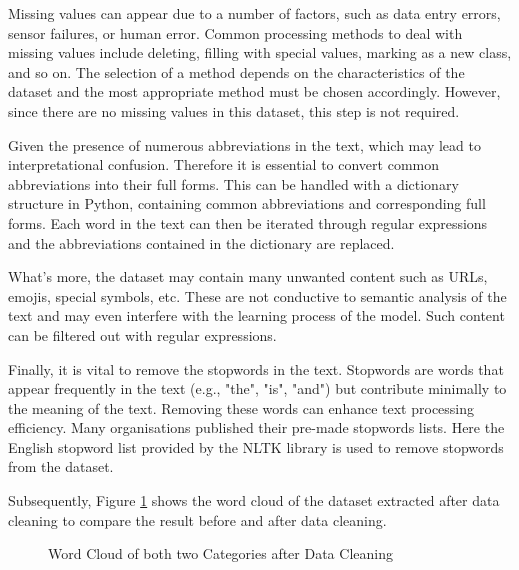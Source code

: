 \documentclass[ %
                    author={Bocheng Wang},
                supervisor={Dr. Qiang Liu},
                    degree={MSc},
                     title={A Research on Identification of Suicide Ideation in Texts with Multiple Models},
                      type={},
                      year={2024}]{dissertation}
\begin{document}
Missing values can appear due to a number of factors, such as data entry errors, sensor failures, or human error. Common processing methods to deal with missing values include deleting, filling with special values, marking as a new class, and so on. The selection of a method depends on the characteristics of the dataset and the most appropriate method must be chosen accordingly. However, since there are no missing values in this dataset, this step is not required.

Given the presence of numerous abbreviations in the text, which may lead to interpretational confusion. Therefore it is essential to convert common abbreviations into their full forms. This can be handled with a dictionary structure in Python, containing common abbreviations and corresponding full forms. Each word in the text can then be iterated through regular expressions and the abbreviations contained in the dictionary are replaced.

What's more, the dataset may contain many unwanted content such as URLs, emojis, special symbols, etc. These are not conductive to semantic analysis of the text and may even interfere with the learning process of the model. Such content can be filtered out with regular expressions.

Finally, it is vital to remove the stopwords in the text. Stopwords are words that appear frequently in the text (e.g., "the", "is", "and") but contribute minimally to the meaning of the text. Removing these words can enhance text processing efficiency. Many organisations published their pre-made stopwords lists. Here the English stopword list provided by the NLTK library is used to remove stopwords from the dataset.

Subsequently, Figure \ref{fig:word cloud clean} shows the word cloud of the dataset extracted after data cleaning to compare the result before and after data cleaning.

\begin{figure}[h]
      \centering
      \hfil
      \caption{Word Cloud of both two Categories after Data Cleaning}
      \label{fig:word cloud clean}
\end{figure}
\end{document}
